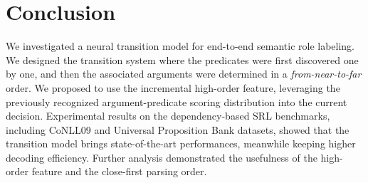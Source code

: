 \documentclass[letterpaper]{article} %
\begin{document}
\begin{CJK}{UTF8}{gbsn}
\begin{table}[!t]
\begin{center}
\end{center}
\caption{
Results for argument role violation.
}
  \label{Role Violation}
\end{table}











\section{Conclusion}

We investigated a neural transition model for end-to-end semantic role labeling.
We designed the transition system where the predicates were first discovered one by one, and then the associated arguments were determined in a \emph{from-near-to-far} order.
We proposed to use the incremental high-order feature, leveraging the previously recognized argument-predicate scoring distribution into the current decision.
Experimental results on the dependency-based SRL benchmarks, including CoNLL09 and Universal Proposition Bank datasets, showed that the transition model brings state-of-the-art performances, meanwhile keeping higher decoding efficiency.
Further analysis demonstrated the usefulness of the high-order feature and the close-first parsing order.













\end{CJK}
\end{document}
